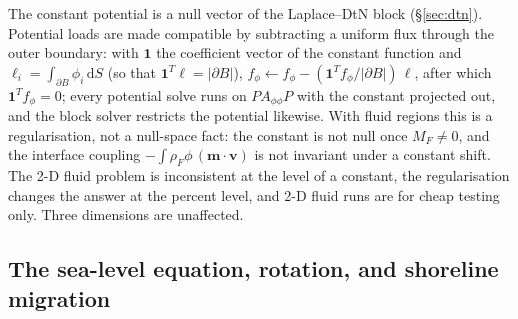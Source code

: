 \documentclass[11pt]{article}
\numberwithin{equation}{section}
\theoremstyle{remark}
\newcommand{\dS}{\,\mathrm{d}S}
\newcommand{\vv}{\mathbf{v}}
\newcommand{\vm}{\mathbf{m}}
\begin{document}
The constant potential is a null vector of the Laplace--DtN block
(\S\ref{sec:dtn}). Potential loads are made compatible by subtracting a
uniform flux through the outer boundary: with $\mathbf{1}$ the coefficient
vector of the constant function and $\ell_i = \int_{\partial B}\phi_i\dS$
(so that $\mathbf{1}^T\ell = |\partial B|$), $f_\phi\leftarrow f_\phi -
(\mathbf{1}^Tf_\phi/|\partial B|)\,\ell$, after which
$\mathbf{1}^Tf_\phi = 0$; every potential solve runs on $PA_{\phi\phi}P$ with
the constant projected out, and the block solver restricts the potential
likewise. With fluid regions this is a regularisation, not a null-space
fact: the constant is not null once $M_F\neq0$, and the interface coupling
$-\int\rho_F\phi\,(\vm\cdot\vv)$ is not invariant under a constant shift.
The 2-D fluid problem is inconsistent at the level of a constant, the
regularisation changes the answer at the percent level, and 2-D fluid runs
are for cheap testing only. Three dimensions are unaffected.

\subsection{The sea-level equation, rotation, and shoreline migration}
\label{sec:mixed-sea}
\end{document}
